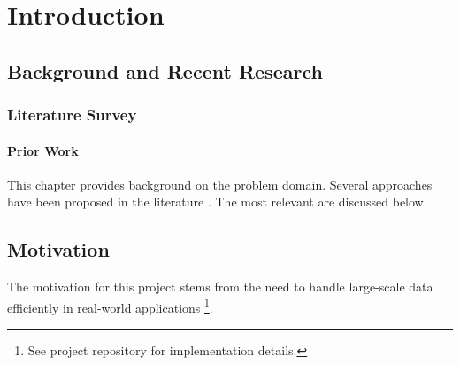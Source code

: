 \chapter{Introduction}

\section{Background and Recent Research}
\subsection{Literature Survey}
\subsubsection{Prior Work}

This chapter provides background on the problem domain. Several approaches have been proposed
in the literature \cite{citation-1-name-here}. The most relevant are discussed below.

\section{Motivation}
The motivation for this project stems from the need to handle large-scale data efficiently
in real-world applications \footnote{See project repository for implementation details.}.
